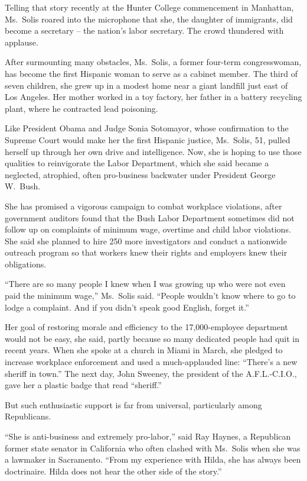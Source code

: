 ﻿\documentclass[12pt]{article}
\begin{document}
Telling that story recently at the Hunter College commencement in Manhattan, Ms.~Solis roared into
the microphone that she, the daughter of immigrants, did become a secretary -- the nation's labor
secretary. The crowd thundered with applause.

After surmounting many obstacles, Ms.~Solis, a former four-term congresswoman, has become the first
Hispanic woman to serve as a cabinet member. The third of seven children, she grew up in a modest
home near a giant landfill just east of Los Angeles. Her mother worked in a toy factory, her father
in a battery recycling plant, where he contracted lead poisoning.

Like President Obama and Judge Sonia Sotomayor, whose confirmation to the Supreme Court would make
her the first Hispanic justice, Ms.~Solis, 51, pulled herself up through her own drive and
intelligence. Now, she is hoping to use those qualities to reinvigorate the Labor Department, which
she said became a neglected, atrophied, often pro-business backwater under President George W.~Bush.

She has promised a vigorous campaign to combat workplace violations, after government auditors found
that the Bush Labor Department sometimes did not follow up on complaints of minimum wage, overtime
and child labor violations. She said she planned to hire 250 more investigators and conduct a
nationwide outreach program so that workers knew their rights and employers knew their obligations.

``There are so many people I knew when I was growing up who were not even paid the minimum wage,''
Ms.~Solis said. ``People wouldn't know where to go to lodge a complaint. And if you didn't speak
good English, forget it.''

Her goal of restoring morale and efficiency to the 17,000-employee department would not be easy, she
said, partly because so many dedicated people had quit in recent years. When she spoke at a church
in Miami in March, she pledged to increase workplace enforcement and used a much-applauded line:
``There's a new sheriff in town.'' The next day, John Sweeney, the president of the A.F.L.-C.I.O.,
gave her a plastic badge that read ``sheriff.''

But such enthusiastic support is far from universal, particularly among Republicans.

``She is anti-business and extremely pro-labor,'' said Ray Haynes, a Republican former state senator
in California who often clashed with Ms.~Solis when she was a lawmaker in Sacramento. ``From my
experience with Hilda, she has always been doctrinaire. Hilda does not hear the other side of the
story.''
\end{document}
